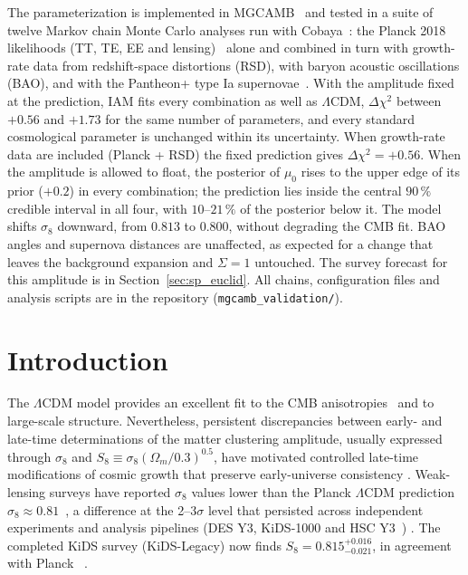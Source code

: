 The parameterization is implemented in MGCAMB~\cite{Zhao2009MGCAMB,Wang2023MGCAMB} and tested in a suite of twelve Markov chain Monte Carlo
analyses run with Cobaya~\cite{Torrado2021}: the Planck 2018 likelihoods (TT, TE, EE and lensing)~\cite{Planck2018V,Planck2018VIII} alone and
combined in turn with growth-rate data from redshift-space distortions (RSD), with baryon acoustic oscillations (BAO), and with the Pantheon+ type Ia
supernovae~\cite{Scolnic2022,Brout2022}. With the amplitude fixed at the prediction, IAM fits every combination as well as
$\Lambda$CDM, $\Delta\chi^2$ between $+0.56$ and $+1.73$ for the same number of parameters, and every standard cosmological parameter is
unchanged within its uncertainty. When growth-rate data are included (Planck + RSD) the fixed prediction gives $\Delta\chi^2=+0.56$. When the
amplitude is allowed to float, the posterior of $\mu_0$ rises to the upper edge of its prior ($+0.2$) in every combination; the prediction lies
inside the central $90\,\%$ credible interval in all four, with $10$--$21\,\%$ of the posterior below it. The model shifts $\sigma_8$ downward,
from $0.813$ to $0.800$, without degrading the CMB fit. BAO angles and supernova distances are unaffected, as expected for a change that
leaves the background expansion and $\Sigma=1$ untouched. The survey forecast for this amplitude is in Section~\ref{sec:sp_euclid}. All chains, configuration files and analysis scripts are in the repository
(\texttt{mgcamb\_validation/}).

\section{Introduction}\label{sec:lt_intro}
The $\Lambda$CDM model provides an excellent fit to the CMB anisotropies~\cite{Planck2018VI} and to large-scale structure. Nevertheless, persistent
discrepancies between early- and late-time determinations of the matter clustering amplitude, usually expressed through $\sigma_8$ and
$S_8\equiv\sigma_8(\Omega_m/0.3)^{0.5}$, have motivated controlled late-time modifications of cosmic growth that preserve early-universe consistency
\cite{DESY3,Heymans2021,HSCY3}. Weak-lensing surveys have reported $\sigma_8$ values lower than the Planck $\Lambda$CDM prediction
$\sigma_8\approx0.81$~\cite{Planck2018VI}, a difference at the 2--3$\sigma$ level that persisted across independent experiments and analysis
pipelines (DES Y3, KiDS-1000 and HSC Y3~\cite{DESY3,Asgari2021,Heymans2021,HSCY3}) \observed. The completed KiDS survey (KiDS-Legacy) now finds
$S_8=0.815^{+0.016}_{-0.021}$, in agreement with Planck~\cite{Wright2025} \observed.

